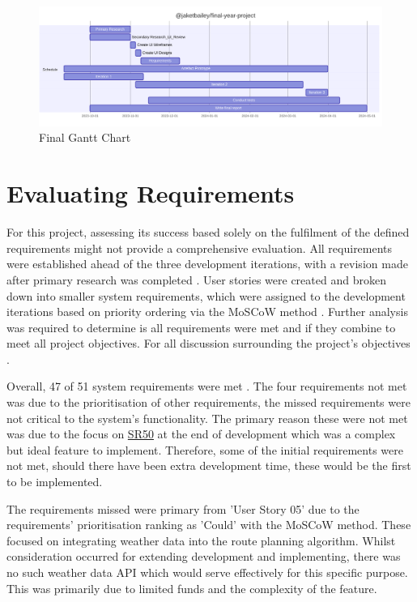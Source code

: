 \begin{figure}[h!]
    \centering
    \includegraphics[width=1\linewidth]{figures/Actual FYP Gantt.pdf}
    \caption{Final Gantt Chart}
    \label{fig:final-gantt}
\end{figure}

\clearpage
\section{Evaluating Requirements}
\label{evaluation:requirements}

For this project, assessing its success based solely on the fulfilment of the defined requirements might not provide a comprehensive evaluation. All requirements were established ahead of the three development iterations, with a revision made after primary research was completed . User stories were created and broken down into smaller system requirements, which were assigned to the development iterations based on priority ordering via the MoSCoW method . Further analysis was required to determine is all requirements were met and if they combine to meet all project objectives. For all discussion surrounding the project's objectives .

Overall, 47 of 51 system requirements were met . The four requirements not met was due to the prioritisation of other requirements, the missed requirements were not critical to the system's functionality. The primary reason these were not met was due to the focus on \hyperref[SR:50]{SR50} at the end of development which was a complex but ideal feature to implement. Therefore, some of the initial requirements were not met, should there have been extra development time, these would be the first to be implemented.

The requirements missed were primary from 'User Story 05'  due to the requirements' prioritisation ranking as 'Could' with the MoSCoW method. These focused on integrating weather data into the route planning algorithm. Whilst consideration occurred for extending development and implementing, there was no such weather data API which would serve effectively for this specific purpose. This was primarily due to limited funds and the complexity of the feature.

